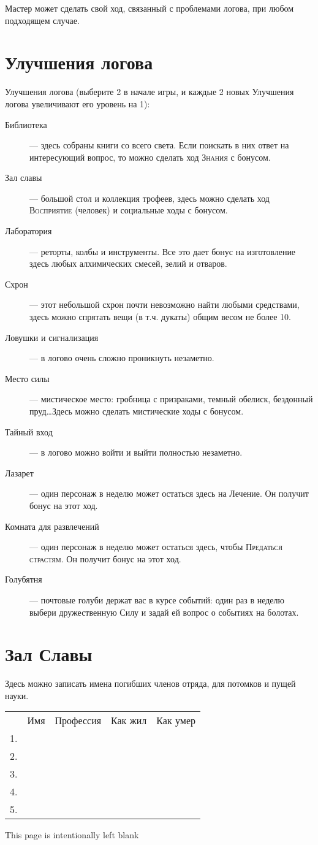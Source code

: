 \documentclass[10pt,twoside]{report}
\begin{document}
Мастер может сделать свой
ход, связанный с проблемами логова, при любом подходящем случае.
\vfill
\pagebreak


\section*{Улучшения логова}

Улучшения логова (выберите 2 в начале игры, и каждые 2 новых Улучшения
логова увеличивают его уровень на 1):
\begin{description}
  \item[Библиотека]--- здесь собраны книги со всего света. Если
    поискать в них ответ на интересующий вопрос, то можно сделать ход
    \textsc{Знания} с бонусом.
  \item[Зал славы]--- большой стол и коллекция трофеев, здесь можно
    сделать ход \textsc{Восприятие} (человек) и социальные ходы с бонусом.
  \item[Лаборатория]--- реторты, колбы и инструменты. Все это дает
    бонус на изготовление здесь любых алхимических смесей, зелий и
    отваров.
  \item[Схрон]--- этот небольшой схрон почти невозможно найти любыми
    средствами, здесь можно спрятать вещи (в т.ч. дукаты) общим весом
    не более 10.
  \item[Ловушки и сигнализация]--- в логово очень сложно проникнуть
    незаметно.
  \item[Место силы]--- мистическое место: гробница с призраками,
    темный обелиск, бездонный пруд\ldots Здесь можно сделать
    мистические ходы с бонусом.
  \item[Тайный вход]--- в логово можно войти и выйти полностью
    незаметно.
  \item[Лазарет]--- один персонаж в неделю может остаться здесь на
    Лечение. Он получит бонус на этот ход.
  \item[Комната для развлечений]--- один персонаж в неделю может
    остаться здесь, чтобы \textsc{Предаться страстям}. Он получит бонус на этот
    ход.
  \item[Голубятня]--- почтовые голуби держат вас в курсе событий: один
    раз в неделю выбери дружественную Силу и задай ей вопрос о
    событиях на болотах.
\end{description}
\vfill
\pagebreak

\section*{Зал Славы}
Здесь можно записать имена погибших членов отряда, для потомков и
пущей науки.

\begin{tabular}{p{0.5cm} l l l l}
  &Имя&Профессия&Как жил&Как умер \\
  1.&&&& \\
  2.&&&& \\
  3.&&&& \\
  4.&&&& \\
  5.&&&& \\
  
\end{tabular}

\vfill

\pagebreak
\thispagestyle{empty}
This page is intentionally left blank
\end{document}
